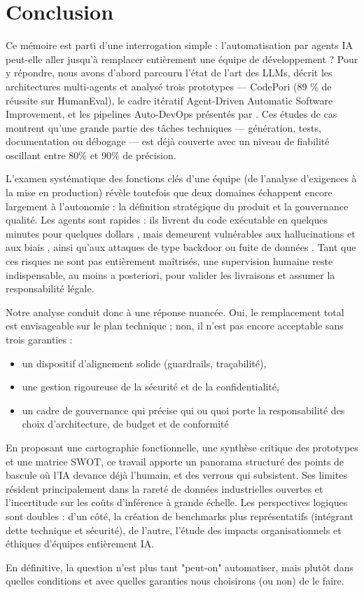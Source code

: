 \chapter{Conclusion} \label{conclusion}

Ce mémoire est parti d’une interrogation simple : l’automatisation par agents IA peut-elle aller jusqu’à remplacer entièrement une équipe de développement ?
Pour y répondre, nous avons d’abord parcouru l’état de l’art des LLMs, décrit les architectures multi-agents et analysé trois prototypes — CodePori (89 \% de réussite sur HumanEval), le cadre itératif Agent-Driven Automatic Software Improvement, et les pipelines Auto-DevOps présentés par \textcite{khan_ai-driven_2025}. Ces études de cas montrent qu’une grande partie des tâches techniques — génération, tests, documentation ou débogage — est déjà couverte avec un niveau de fiabilité oscillant entre 80\% et 90\% de précision.

L’examen systématique des fonctions clés d’une équipe (de l’analyse d’exigences à la mise en production) révèle toutefois que deux domaines échappent encore largement à l’autonomie : la définition stratégique du produit et la gouvernance qualité. Les agents sont rapides : ils livrent du code exécutable en quelques minutes pour quelques dollars \parencite{rasheed_codepori_2024}, mais demeurent vulnérables aux hallucinations et aux biais \parencite{cui_risk_2024}, ainsi qu’aux attaques de type backdoor ou fuite de données \parencite{wang_unique_2024}. Tant que ces risques ne sont pas entièrement maîtrisés, une supervision humaine reste indispensable, au moins a posteriori, pour valider les livraisons et assumer la responsabilité légale.

Notre analyse conduit donc à une réponse nuancée. Oui, le remplacement total est envisageable sur le plan technique ; non, il n’est pas encore acceptable sans trois garanties :

\begin{itemize}
    \item un dispositif d’alignement solide (guardrails, traçabilité),
    \item une gestion rigoureuse de la sécurité et de la confidentialité,
    \item un cadre de gouvernance qui précise qui ou quoi porte la responsabilité des choix d’architecture, de budget et de conformité
\end{itemize}

En proposant une cartographie fonctionnelle, une synthèse critique des prototypes et une matrice SWOT, ce travail apporte un panorama structuré des points de bascule où l’IA devance déjà l’humain, et des verrous qui subsistent. Ses limites résident principalement dans la rareté de données industrielles ouvertes et l’incertitude sur les coûts d’inférence à grande échelle. Les perspectives logiques sont doubles : d’un côté, la création de benchmarks plus représentatifs (intégrant dette technique et sécurité), de l’autre, l’étude des impacts organisationnels et éthiques d’équipes entièrement IA.

En définitive, la question n’est plus tant "peut-on" automatiser, mais plutôt dans quelles conditions et avec quelles garanties nous choisirons (ou non) de le faire.